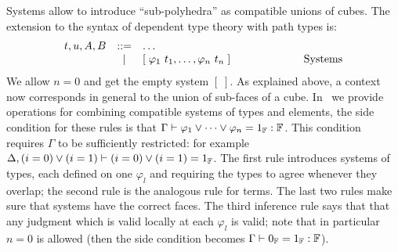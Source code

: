 Systems allow to introduce ``sub-polyhedra'' as compatible unions of
cubes.  The extension to the syntax of dependent type theory with path
types is:
%
\[
\begin{array}{lcll}
  t,u,A,B       & ::= & \dots & \\
                & {~\mid~}  &  [ \; \varphi_1 ~ t_1, \dots, \varphi_n ~ t_n \; ]
                      & \hspace{2cm} \text{Systems}
\end{array}
\]
We allow $n = 0$ and get the empty system $[ \; ]$. As explained
above, a context now corresponds in general to the union of sub-faces
of a cube. In~ we provide operations for combining
compatible systems of types and elements, the side condition for these
rules is that $\Gamma \vdash \varphi_1 \vee \dots \vee \varphi_n = 1_{\mathbb{F}}
: \mathbb{F}$. This condition requires $\Gamma$ to be sufficiently
restricted: for example $\Delta, (i = 0) \vee (i = 1) \vdash (i = 0)
\vee (i = 1) = 1_{\mathbb{F}}$.  The first rule introduces systems of types,
each defined on one $\varphi_l$ and requiring the types to agree
whenever they overlap; the second rule is the analogous rule for
terms.  The last two rules make sure that systems have the correct
faces.  The third inference rule says that that any judgment which is
valid locally at each $\varphi_l$ is valid; note that in particular
$n=0$ is allowed (then the side condition becomes $\Gamma \vdash 0_{\mathbb{F}} =
1_{\mathbb{F}} : \mathbb{F}$).
%
